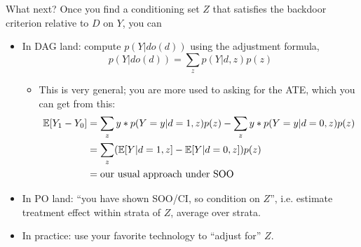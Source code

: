 \documentclass[xcolor=dvipsnames]{beamer}
\newcommand\E{\mathbb{E}}
\begin{document}
\begin{frame}{What next?}
 Once you find a conditioning set $Z$ that satisfies the backdoor criterion relative to $D$ on $Y$, you can\\
\small
\begin{itemize}
\item<2-> In DAG land:  compute $p(Y|do(d))$ using the adjustment formula, $$p(Y|do(d))=\sum_z p(Y|d,z)p(z)$$
\begin{itemize}
\item<3-> This is very general; you are more used to asking for the ATE, which you can get from this:
\begin{align*}
\scriptsize
\E[Y_1-Y_0] &= \sum_z y*p(Y=y|d=1,z)p(z)-\sum_z y*p(Y=y|d=0,z)p(z)  \\
&= \sum_z (\E[Y|d=1,z]-\E[Y|d=0,z])p(z) \\
&= \text{our usual approach under SOO}
\end{align*}

\end{itemize} 
\item<4-> In PO land: ``you have shown SOO/CI, so condition on $Z$'', i.e. estimate treatment effect within strata of $Z$, average over strata.
\item<5-> In practice: use your favorite technology to ``adjust for'' $Z$.
\end{itemize}
\end{frame}
\end{document}
